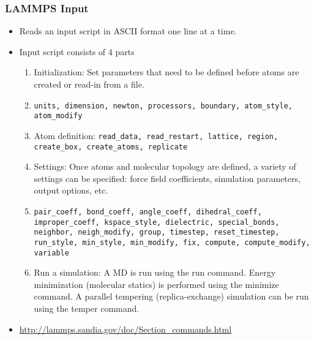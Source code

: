\documentclass[slidestop,mathserif,compress,xcolor=svgnames]{beamer}
\begin{document}
\begin{frame}
  \frametitle{\small LAMMPS Input}
  \begin{itemize}
    \item Reads an input script in ASCII format one line at a time.
    \item Input script consists of 4 parts
    \begin{enumerate}
      \item Initialization: Set parameters that need to be defined before atoms are created or read-in from a file.
      \item[] \texttt{units, dimension, newton, processors, boundary, atom\_style, atom\_modify}
      \item Atom definition: \texttt{read\_data, read\_restart, lattice, region, create\_box, create\_atoms, replicate}
      \item Settings: Once atoms and molecular topology are defined, a variety of settings can be specified: force field coefficients, simulation parameters, output options, etc. 
      \item[] \texttt{pair\_coeff, bond\_coeff, angle\_coeff, dihedral\_coeff, improper\_coeff, kspace\_style, dielectric, special\_bonds, neighbor, neigh\_modify, group, timestep, reset\_timestep, run\_style, min\_style, min\_modify, fix, compute, compute\_modify, variable}
      \item Run a simulation: A MD is run using the run command. Energy minimization (molecular statics) is performed using the minimize command. A parallel tempering (replica-exchange) simulation can be run using the temper command.
    \end{enumerate}
    \item \url{http://lammps.sandia.gov/doc/Section_commands.html}
  \end{itemize}
\end{frame}
\end{document}
